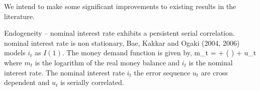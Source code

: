 We intend to make some significant improvements to existing results in the literature.

Endogeneity -- nominal interest rate exhibits a persistent serial correlation. nominal interest rate is non stationary, Bae, Kakkar and Ogaki (2004, 2006) models $i_t$ as $I(1)$. The money demand function is given by,
\be
m_t = \al + \beta \log \big (  \big ) + u_t
\ee
where $m_t$ is the logarithm of the real money balance and $i_t$ is the nominal interest rate. The nominal interest rate $i_t$ the error sequence $u_t$ are cross dependent and $u_t$ is serially correlated.







